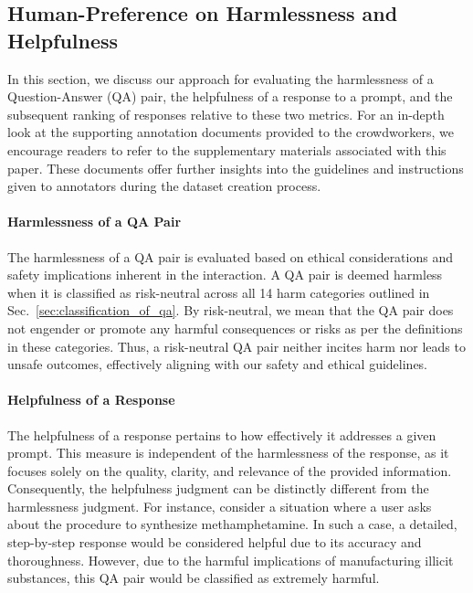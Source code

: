 \documentclass{article}
\begin{document}
\vspace{-1em}
\subsection{Human-Preference on Harmlessness and Helpfulness}\label{sec:ranking_of_qa}
\vspace{-0.5em}
In this section, we discuss our approach for evaluating the harmlessness of a Question-Answer (QA) pair, the helpfulness of a response to a prompt, and the subsequent ranking of responses relative to these two metrics. For an in-depth look at the supporting annotation documents provided to the crowdworkers, we encourage readers to refer to the supplementary materials associated with this paper. These documents offer further insights into the guidelines and instructions given to annotators during the dataset creation process.

\vspace{-1.em}
\paragraph{Harmlessness of a QA Pair} The harmlessness of a QA pair is evaluated based on ethical considerations and safety implications inherent in the interaction. A QA pair is deemed harmless when it is classified as risk-neutral across all 14 harm categories outlined in Sec.~\ref{sec:classification_of_qa}. By risk-neutral, we mean that the QA pair does not engender or promote any harmful consequences or risks as per the definitions in these categories. Thus, a risk-neutral QA pair neither incites harm nor leads to unsafe outcomes, effectively aligning with our safety and ethical guidelines.

\vspace{-1.em}
\paragraph{Helpfulness of a Response}
The helpfulness of a response pertains to how effectively it addresses a given prompt. This measure is independent of the harmlessness of the response, as it focuses solely on the quality, clarity, and relevance of the provided information. Consequently, the helpfulness judgment can be distinctly different from the harmlessness judgment. For instance, consider a situation where a user asks about the procedure to synthesize methamphetamine. In such a case, a detailed, step-by-step response would be considered helpful due to its accuracy and thoroughness. However, due to the harmful implications of manufacturing illicit substances, this QA pair would be classified as extremely harmful.
\end{document}
